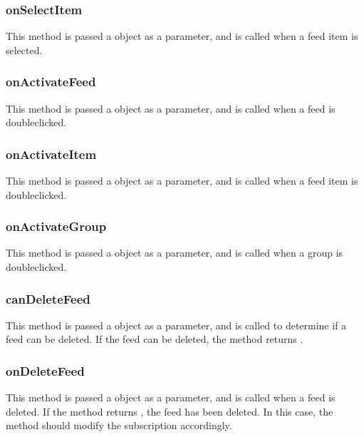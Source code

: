 \documentclass[letterpaper,12pt,english,openany,oneside]{sphinxmanual}
\begin{document}
\subsubsection{onSelectItem}
\label{\detokenize{Tracker_InboxAPI:onselectitem}}
This method is passed a  object as a parameter, and is called when a feed item is selected.




\subsubsection{onActivateFeed}
\label{\detokenize{Tracker_InboxAPI:onactivatefeed}}
This method is passed a  object as a parameter, and is called when a feed is double\sphinxhyphen{}clicked.




\subsubsection{onActivateItem}
\label{\detokenize{Tracker_InboxAPI:onactivateitem}}
This method is passed a  object as a parameter, and is called when a feed item is double\sphinxhyphen{}clicked.




\subsubsection{onActivateGroup}
\label{\detokenize{Tracker_InboxAPI:onactivategroup}}
This method is passed a  object as a parameter, and is called when a group is double\sphinxhyphen{}clicked.




\subsubsection{canDeleteFeed}
\label{\detokenize{Tracker_InboxAPI:candeletefeed}}
This method is passed a  object as a parameter, and is called to determine if a feed can be deleted. If the feed can be deleted, the method returns .




\subsubsection{onDeleteFeed}
\label{\detokenize{Tracker_InboxAPI:ondeletefeed}}
This method is passed a  object as a parameter, and is called when a feed is deleted. If the method returns , the feed has been deleted. In this case, the method should modify the subscription accordingly.
\end{document}
